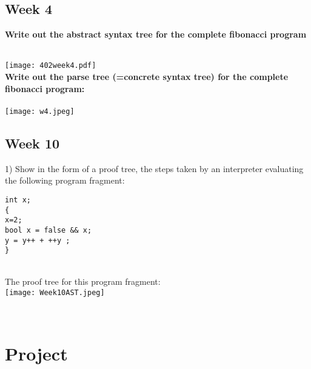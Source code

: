 \documentclass{article}
\theoremstyle{theorem}
\theoremstyle{definition}
\theoremstyle{remark}
\begin{document}
\subsection{Week 4}
\textbf{Write out the abstract syntax tree for the complete fibonacci program}

\\
\texttt{[image: 402week4.pdf]}
\\

\textbf{Write out the parse tree (=concrete syntax tree) for the complete fibonacci program:}
\\

\\
\texttt{[image: w4.jpeg]}

\subsection{Week 10}
1) Show in the form of a proof tree, the steps taken by an interpreter evaluating the following program fragment:


\begin{lstlisting}
int x;
{
x=2;
bool x = false && x;
y = y++ + ++y ;
}
\end{lstlisting}
\\
The proof tree for this program fragment:
\\
\texttt{[image: Week10AST.jpeg]}


\\




\section{Project}


\end{document}
